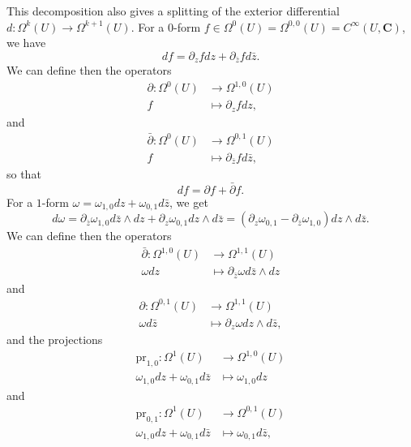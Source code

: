 \documentclass[12pt,a4paper]{book}
\theoremstyle{definition} \newtheorem{defn}[thm]{Definition}
\theoremstyle{definition} \newtheorem{ejemplo}[thm]{Example}
\theoremstyle{definition} \newtheorem{ejercicio}[thm]{Exercise}
\theoremstyle{remark} \newtheorem*{obs}{Remark}
\def\pr{\mathrm{pr}}
\def\CC{\mathbf{C}}
\begin{document}
This decomposition also gives a splitting of the exterior differential $d:\Omega^k(U)\rightarrow \Omega^{k+1}(U)$. For a $0$-form $f \in \Omega^0(U)=\Omega^{0,0}(U)=C^{\infty}(U,\CC)$, we have
\begin{equation*}
  df = \partial_z f dz + \partial_{\bar{z}}f d\bar{z}.
\end{equation*}
We can define then the operators 
\begin{align*}
  \partial :\Omega^0(U)&\longrightarrow \Omega^{1,0}(U)\\ 
    f &\longmapsto \partial_z f dz, 
  \end{align*}
  and
\begin{align*}
  \bar{\partial} :\Omega^0(U)&\longrightarrow \Omega^{0,1}(U)\\ 
  f &\longmapsto \partial_{\bar{z}} f d\bar{z}, 
  \end{align*}
  so that
\begin{equation*}
  df = \partial f + \bar{\partial} f.
\end{equation*}
For a $1$-form $\omega=\omega_{1,0} dz + \omega_{0,1} d\bar{z}$, we get
\begin{equation*}
  d\omega = \partial_{\bar{z}} \omega_{1,0} d\bar{z} \wedge dz + \partial_z \omega_{0,1} dz \wedge d\bar{z}= (\partial_z \omega_{0,1} - \partial_{\bar{z}}\omega_{1,0}) dz \wedge d\bar{z}.
\end{equation*}
We can define then the operators
\begin{align*}
  \bar{\partial} :\Omega^{1,0}(U)&\longrightarrow \Omega^{1,1}(U)\\ 
  \omega dz &\longmapsto \partial_{\bar{z}} \omega d\bar{z}\wedge dz 
  \end{align*}
  and
\begin{align*}
  \partial :\Omega^{0,1}(U)&\longrightarrow \Omega^{1,1}(U)\\ 
  \omega d\bar{z} &\longmapsto \partial_{z} \omega dz\wedge d\bar{z}, 
  \end{align*}
  and the projections
  \begin{align*}
    \pr_{1,0} :\Omega^1(U)&\longrightarrow \Omega^{1,0}(U)\\ 
    \omega_{1,0} dz + \omega_{0,1} d\bar{z} &\longmapsto \omega_{1,0}dz
    \end{align*}
    and
  \begin{align*}
    \pr_{0,1} :\Omega^1(U)&\longrightarrow \Omega^{0,1}(U)\\ 
    \omega_{1,0} dz + \omega_{0,1} d\bar{z} &\longmapsto \omega_{0,1}d\bar{z},
    \end{align*}
\end{document}
